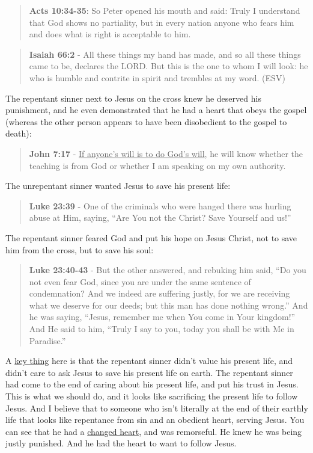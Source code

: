 \documentclass[11pt]{article}
\begin{document}
\begin{quote}
\textbf{Acts 10:34-35}: So Peter opened his mouth and said: Truly I understand that God shows no partiality, but in every nation anyone who fears him and does what is right is acceptable to him.
\end{quote}

\begin{quote}
\textbf{Isaiah 66:2} - All these things my hand has made, and so all these things came to be, declares the LORD. But this is the one to whom I will look: he who is humble and contrite in spirit and trembles at my word. (ESV)
\end{quote}

The repentant sinner next to Jesus on the cross knew he deserved his punishment, and he even demonstrated that he had a heart that obeys the gospel (whereas the other person appears to have been disobedient to the gospel to death):

\begin{quote}
\textbf{John 7:17} - \uline{If anyone's will is to do God's will}, he will know whether the teaching is from God or whether I am speaking on my own authority.
\end{quote}

The unrepentant sinner wanted Jesus to save his present life:

\begin{quote}
\textbf{Luke 23:39} - One of the criminals who were hanged there was hurling abuse at Him, saying, “Are You not the Christ? Save Yourself and us!”
\end{quote}

The repentant sinner feared God and put his hope on Jesus Christ, not to save him from the cross, but to save his soul:

\begin{quote}
\textbf{Luke 23:40-43} - But the other answered, and rebuking him said, “Do you not even fear God, since you are under the same sentence of condemnation? And we indeed are suffering justly, for we are receiving what we deserve for our deeds; but this man has done nothing wrong.” And he was saying, “Jesus, remember me when You come in Your kingdom!” And He said to him, “Truly I say to you, today you shall be with Me in Paradise.”
\end{quote}

A \uline{key thing} here is that the repentant sinner didn't value his present life, and didn't care to ask Jesus to save his present life on earth. The repentant sinner had come to the end of caring about his present life, and put his trust in Jesus. This is what we should do, and it looks like sacrificing the present life to follow Jesus. And I believe that to someone who isn't literally at the end of their earthly life that looks like repentance from sin and an obedient heart, serving Jesus. You can see that he had a \uline{changed heart}, and was remorseful. He knew he was being justly punished. And he had the heart to want to follow Jesus.
\end{document}
